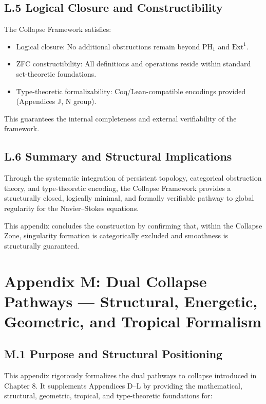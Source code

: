 \documentclass[11pt]{article}
\begin{document}
\subsection*{L.5 Logical Closure and Constructibility}

The Collapse Framework satisfies:

\begin{itemize}
  \item Logical closure: No additional obstructions remain beyond \( \mathrm{PH}_1 \) and \( \mathrm{Ext}^1 \).
  \item ZFC constructibility: All definitions and operations reside within standard set-theoretic foundations.
  \item Type-theoretic formalizability: Coq/Lean-compatible encodings provided (Appendices J, N group).
\end{itemize}

This guarantees the internal completeness and external verifiability of the framework.

\subsection*{L.6 Summary and Structural Implications}

Through the systematic integration of persistent topology, categorical obstruction theory, and type-theoretic encoding,  
the Collapse Framework provides a structurally closed, logically minimal, and formally verifiable pathway to global regularity for the Navier–Stokes equations.

This appendix concludes the construction by confirming that, within the Collapse Zone, singularity formation is categorically excluded and smoothness is structurally guaranteed.



\section*{Appendix M: Dual Collapse Pathways --- Structural, Energetic, Geometric, and Tropical Formalism}

\subsection*{M.1 Purpose and Structural Positioning}

This appendix rigorously formalizes the dual pathways to collapse introduced in Chapter 8. It supplements Appendices D--L by providing the mathematical, structural, geometric, tropical, and type-theoretic foundations for:
\end{document}
